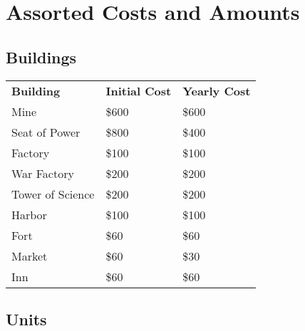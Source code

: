 
\chapter{Assorted Costs and Amounts}


\section{Buildings}

\begin{tabular}{|p{1.3in} p{1.3in} p{1.3in}|}
    \hline
    \textbf{Building} & \textbf{Initial Cost} & \textbf{Yearly Cost} \\ 
    \rowcolor{gray}Mine & \$600 & \$600 \\ 
    Seat of Power & \$800 & \$400 \\ 
    \rowcolor{gray}Factory    & \$100 & \$100 \\ 
    War Factory    & \$200 & \$200 \\ 
    \rowcolor{gray}Tower of Science & \$200 & \$200 \\ 
    Harbor & \$100 &\$100 \\ 
    \rowcolor{gray}Fort & \$60 & \$60 \\ 
    Market & \$60 & \$30 \\ 
    \rowcolor{gray}Inn    & \$60 & \$60 \\ 
    \hline
\end{tabular}    

\clearpage

\section{Units}

